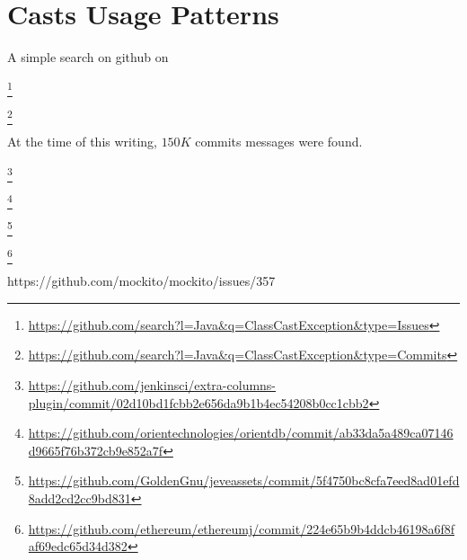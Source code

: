 
\chapter{Casts Usage Patterns}
\label{cha:casts}

A simple search on github on 

\footnote{\url{https://github.com/search?l=Java&q=ClassCastException&type=Issues}}

\footnote{\url{https://github.com/search?l=Java&q=ClassCastException&type=Commits}}

At the time of this writing, \circa{} $150K$ commits messages were found.

\footnote{\url{https://github.com/jenkinsci/extra-columns-plugin/commit/02d10bd1fcbb2e656da9b1b4ec54208b0cc1cbb2}}

\footnote{\url{https://github.com/orientechnologies/orientdb/commit/ab33da5a489ca07146d9665f76b372cb9e852a7f}}

\footnote{\url{https://github.com/GoldenGnu/jeveassets/commit/5f4750bc8cfa7eed8ad01efd8add2cd2cc9bd831}}

\footnote{\url{https://github.com/ethereum/ethereumj/commit/224e65b9b4ddcb46198a6f8faf69edc65d34d382}}



https://github.com/mockito/mockito/issues/357


